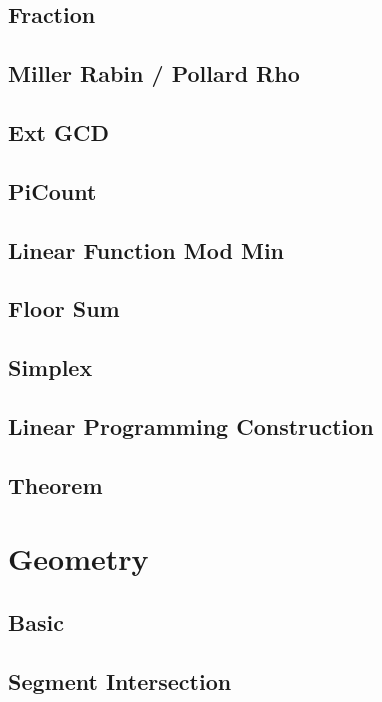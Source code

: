 \subsection{Fraction}

\subsection{Miller Rabin / Pollard Rho}

\subsection{Ext GCD}

\subsection{PiCount}

\subsection{Linear Function Mod Min}

\subsection{Floor Sum}

\subsection{Simplex}

\subsection{Linear Programming Construction}

\subsection{Theorem}


\section{Geometry}
\subsection{Basic}

\subsection{Segment Intersection}

